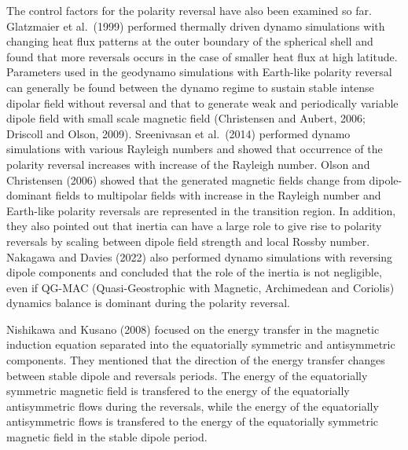 The control factors for the polarity reversal have also been examined so far.
Glatzmaier et al.\ (1999) %
performed thermally driven dynamo simulations with changing heat flux patterns at the outer boundary of the spherical shell and found that more reversals occurs in the case of smaller heat flux at high latitude. 
Parameters used in the geodynamo simulations with Earth-like polarity reversal can generally be found between the dynamo regime to sustain stable intense dipolar field without reversal and that to generate weak and periodically variable dipole field with small scale magnetic field (Christensen and Aubert, 2006; 
Driscoll and Olson, 2009). %
Sreenivasan et al.\ (2014) %
performed dynamo simulations with various Rayleigh numbers and showed that occurrence of the polarity reversal increases with increase of the Rayleigh number. 
{\color{magenta}
Olson and Christensen (2006) showed that the generated magnetic fields change from dipole-dominant fields to multipolar fields with increase in the Rayleigh number and Earth-like polarity reversals are represented in the transition region.
}
In addition, they also pointed out that inertia can have a large role to give rise to polarity reversals by scaling between dipole field strength and local Rossby number.
Nakagawa and Davies (2022) 
also performed dynamo simulations with reversing dipole components and concluded that the role of the inertia is not negligible, even if QG-MAC (Quasi-Geostrophic with Magnetic, Archimedean and Coriolis) dynamics balance is dominant during the polarity reversal.

Nishikawa and Kusano (2008) 
focused on the energy transfer in the magnetic induction equation separated into the equatorially symmetric and antisymmetric components. 
{\color{red}
They
}
mentioned that the direction of the energy transfer changes between stable dipole and reversals periods. 
{\color{magenta}
The energy of the equatorially symmetric magnetic field is transfered to the energy of the equatorially antisymmetric flows during the reversals, while the energy of the equatorially antisymmetric flows is transfered to the energy of the equatorially symmetric magnetic field in the stable dipole period.
}

